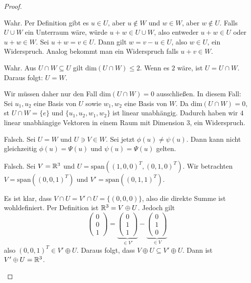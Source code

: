 \begin{proof}
	\begin{parts}
	\item Wahr. Per Definition gibt es $u\in U$, aber $u \not\in W$ und $w\in W$, aber $w\not\in U$. Falls $U\cup W$ ein Unterraum wäre, würde $u+w\in U\cup W$, also entweder $u+w\in U$ oder $u+w\in W$. Sei $u+w=v\in U$. Dann gilt $w=v-u\in U$, also $w\in U$, ein Widerspruch. Analog bekommt man ein Widerspruch falls $u+v\in W$.
	\item Wahr. Aus $U\cap W\subseteq U$ gilt $\text{dim}(U\cap W)\le 2$. Wenn es $2$ wäre, ist $U=U\cap W$. Daraus folgt: $U=W$.

	Wir müssen daher nur den Fall $\text{dim}(U\cap W)=0$ ausschließen. In diesem Fall: Sei $u_1,u_2$ eine Basis von $U$ sowie $w_1,w_2$ eine Basis von $W$. Da $\text{dim}(U\cap W)=0$, st $U\cap W=\{e\} $ und $\{u_1,u_2,w_1,w_2\} $ ist linear unabhängig. Dadurch haben wir $4$ linear unabhängige Vektoren in einem Raum mit Dimension $3$, ein Widerspruch.
\item Falsch. Sei $U=W$ und $U\ni V\in W$. Sei jetzt $\phi(u)\neq \psi(u)$. Dann kann nicht gleichzeitig $\phi(u)=\Psi(u)$ und $\psi(u)=\Psi(u)$ gelten.
\item Falsch. Sei $V=\mathbb{R}^3$ und $U=\text{span}((1,0,0)^T,(0,1,0)^T)$. Wir betrachten $V=\text{span}((0,0,1)^T)$ und $V'=\text{span}((0,1,1)^T)$.

	Es ist klar, dass $V\cap U=V'\cap U=\{(0,0,0)\} $, also die direkte Summe ist wohldefiniert. Per Definition ist $\mathbb{R}^3=V\oplus U$. Jedoch gilt 
	\[
		\begin{pmatrix} 0 \\ 0 \\ 1 \end{pmatrix} = \underbrace{\begin{pmatrix} 0 \\ 1 \\ 1 \end{pmatrix}}_{\in V'} - \underbrace{\begin{pmatrix} 0 \\ 1 \\ 0 \end{pmatrix} }_{\in V}
	\]
	also $\left(0,0,1 \right)^T\in V'\oplus U$. Daraus folgt, dass $V\oplus U\subseteq V'\oplus U$. Dann ist $V'\oplus U=\mathbb{R}^3$.\qedhere
	\end{parts}
\end{proof}

